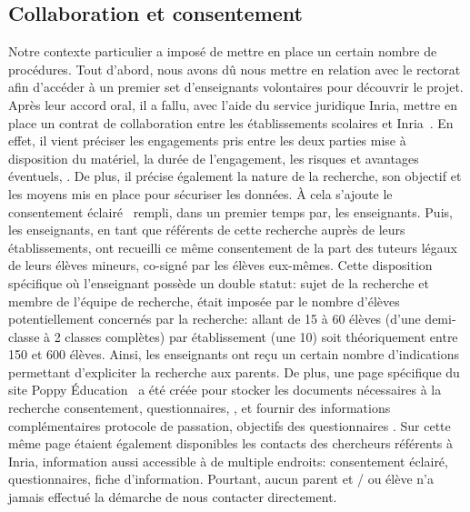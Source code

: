   \subsection{Collaboration et consentement}
    Notre contexte particulier  a imposé de mettre en place un certain nombre de procédures. 
    Tout d'abord, nous avons dû nous mettre en relation avec le rectorat afin d'accéder à un premier set d'enseignants volontaires pour découvrir le projet. Après leur accord oral, il a fallu, avec l'aide du service juridique Inria, mettre en place un contrat de collaboration entre les établissements scolaires et Inria~. En effet, il vient préciser les engagements pris entre les deux parties \eg mise à disposition du matériel, la durée de l'engagement, les risques et avantages éventuels, \etc. De plus, il précise également la nature de la recherche, son objectif et les moyens mis en place pour sécuriser les données. À cela s'ajoute le consentement éclairé~ rempli, dans un premier temps par, les enseignants. Puis, les enseignants, en tant que référents de cette recherche auprès de leurs établissements, ont recueilli ce même consentement de la part des tuteurs légaux de leurs élèves mineurs, co-signé par les élèves eux-mêmes.
    Cette disposition spécifique où l'enseignant possède un double statut: sujet de la recherche et membre de l'équipe de recherche, était imposée par le nombre d'élèves potentiellement concernés par la recherche: allant de 15 à 60 élèves (d'une demi-classe à 2 classes complètes) par établissement (une 10) soit théoriquement entre 150 et 600 élèves. Ainsi, les enseignants ont reçu un certain nombre d'indications permettant d'expliciter la recherche aux parents. De plus, une page spécifique du site Poppy Éducation~ a été créée pour \Li stocker les documents nécessaires à la recherche \eg consentement, questionnaires, \etc, et \ii fournir des informations complémentaires \eg protocole de passation, objectifs des questionnaires \etc. Sur cette même page étaient également disponibles les contacts des chercheurs référents à Inria, information aussi accessible à de multiple endroits: consentement éclairé, questionnaires, fiche d'information. Pourtant, aucun parent et / ou élève n'a jamais effectué la démarche de nous contacter directement.
